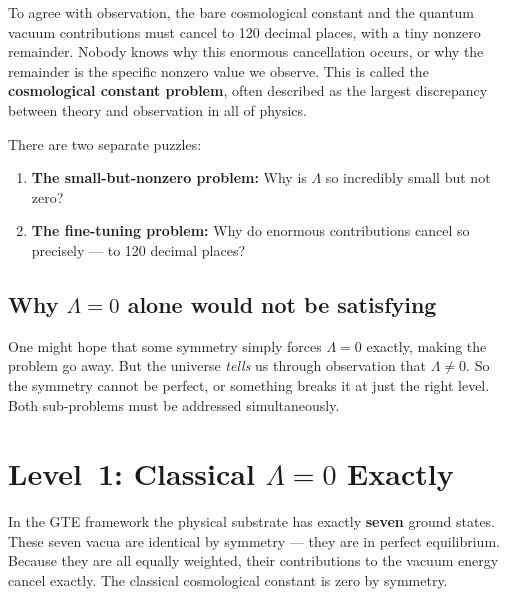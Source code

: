 \documentclass[11pt,a4paper]{article}
\newcommand{\term}[1]{\textbf{#1}}
\begin{document}
\begin{tcolorbox}[colback=boxred,colframe=red!60!black,
  title={The worst fine-tuning problem in physics}]
To agree with observation, the bare cosmological constant and the quantum
vacuum contributions must cancel to 120 decimal places, with a tiny nonzero
remainder.  Nobody knows why this enormous cancellation occurs, or why the
remainder is the specific nonzero value we observe.  This is called the
\term{cosmological constant problem}, often described as the largest
discrepancy between theory and observation in all of physics.

There are two separate puzzles:
\begin{enumerate}[itemsep=2pt]
  \item \textbf{The small-but-nonzero problem:} Why is $\Lambda$ so incredibly
    small but not zero?
  \item \textbf{The fine-tuning problem:} Why do enormous contributions cancel
    so precisely --- to 120 decimal places?
\end{enumerate}
\end{tcolorbox}

\subsection{Why $\Lambda = 0$ alone would not be satisfying}

One might hope that some symmetry simply forces $\Lambda = 0$ exactly, making
the problem go away.  But the universe \emph{tells} us through observation that
$\Lambda \neq 0$.  So the symmetry cannot be perfect, or something breaks it at
just the right level.  Both sub-problems must be addressed simultaneously.

\section{Level~1: Classical \texorpdfstring{$\Lambda = 0$}{Lambda = 0} Exactly}
\label{sec:level1}

\begin{tcolorbox}[colback=boxgreen,colframe=green!50!black,
  title={Key idea}]
In the GTE framework the physical substrate has exactly \textbf{seven} ground
states.  These seven vacua are identical by symmetry --- they are in perfect
equilibrium.  Because they are all equally weighted, their contributions to the
vacuum energy cancel exactly.  The classical cosmological constant is zero by
symmetry.
\end{tcolorbox}
\end{document}
